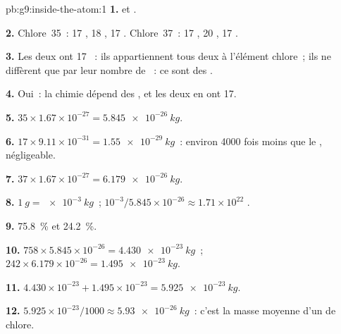 \begin{solution}{pb:g9:inside-the-atom:1}
\textbf{1.}  et .

\textbf{2.} Chlore~35~: 17 , 18 , 17 .
Chlore~37~: 17 , 20 , 17 .

\textbf{3.} Les deux ont 17 ~: ils appartiennent tous deux à
l'élément chlore~; ils ne diffèrent que par leur nombre de ~: ce
sont des .

\textbf{4.} Oui~: la chimie dépend des , et les deux en ont 17.

\textbf{5.} $35 \times 1.67 \times 10^{-27} = \qty{5.845e-26}{kg}$.

\textbf{6.} $17 \times 9.11 \times 10^{-31} = \qty{1.55e-29}{kg}$~:
environ 4000 fois moins que le , négligeable.

\textbf{7.} $37 \times 1.67 \times 10^{-27} = \qty{6.179e-26}{kg}$.

\textbf{8.} $\qty{1}{g} = \qty{e-3}{kg}$~; $10^{-3} / 5.845 \times
10^{-26} \approx 1.71 \times 10^{22}$ .

\textbf{9.} \qty{75.8}{\percent} et \qty{24.2}{\percent}.

\textbf{10.} $758 \times 5.845 \times 10^{-26} = \qty{4.430e-23}{kg}$~;
$242 \times 6.179 \times 10^{-26} = \qty{1.495e-23}{kg}$.

\textbf{11.} $4.430 \times 10^{-23} + 1.495 \times 10^{-23} =
\qty{5.925e-23}{kg}$.

\textbf{12.} $5.925 \times 10^{-23} / 1000 \approx
\qty{5.93e-26}{kg}$~: c'est la masse moyenne d'un  de chlore.
\end{solution}
